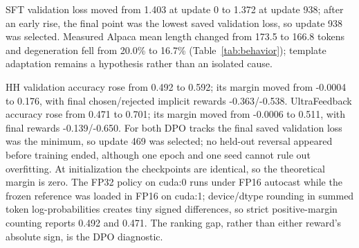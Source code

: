 SFT validation loss moved from 1.403 at update 0 to 1.372 at update 938; after an early rise, the final point was the lowest saved validation loss, so update 938 was selected. Measured Alpaca mean length changed from 173.5 to 166.8 tokens and degeneration fell from 20.0\% to 16.7\% (Table~\ref{tab:behavior}); template adaptation remains a hypothesis rather than an isolated cause.

HH validation accuracy rose from 0.492 to 0.592; its margin moved from -0.0004 to 0.176, with final chosen/rejected implicit rewards -0.363/-0.538. UltraFeedback accuracy rose from 0.471 to 0.701; its margin moved from -0.0006 to 0.511, with final rewards -0.139/-0.650. For both DPO tracks the final saved validation loss was the minimum, so update 469 was selected; no held-out reversal appeared before training ended, although one epoch and one seed cannot rule out overfitting. At initialization the checkpoints are identical, so the theoretical margin is zero. The FP32 policy on cuda:0 runs under FP16 autocast while the frozen reference was loaded in FP16 on cuda:1; device/dtype rounding in summed token log-probabilities creates tiny signed differences, so strict positive-margin counting reports 0.492 and 0.471. The ranking gap, rather than either reward's absolute sign, is the DPO diagnostic.
